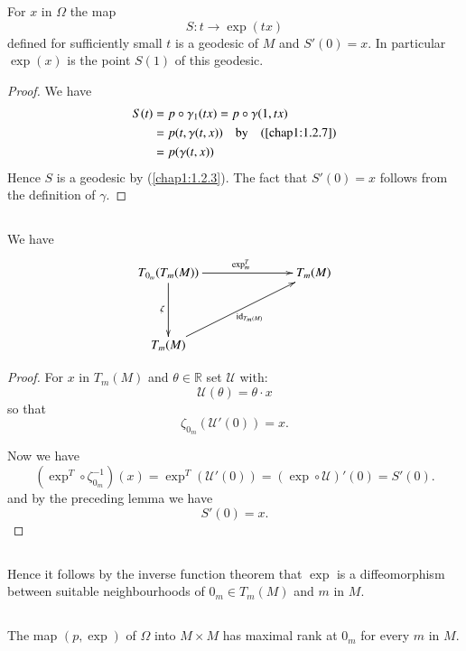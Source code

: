 \begin{lemma*}
For $x$ in $\Omega$ the map 
$$
S:t\to \exp (tx)
$$
defined for sufficiently small $t$ is a geodesic of $M$ and
$S'(0)=x$. In particular $\exp(x)$ is the point $S(1)$ of this geodesic.
\end{lemma*}

\begin{proof}
We have 
\begin{align*}
S(t) &= p\circ \gamma_{1}(tx)=p\circ\gamma(1,tx)\\
 &= p(t,\gamma(t,x))\quad\text{by}\quad \text{(\ref{chap1:1.2.7})}\\
 &= p(\gamma(t,x))
\end{align*}
Hence \pageoriginale $S$ is a geodesic by (\ref{chap1:1.2.3}). The fact that $S'(0)=x$
follows from the definition of $\gamma$.
\end{proof}

\setcounter{subsection}{5}
\subsection{}\label{chap1:1.4.6}
We have
\[
\xymatrix@C=2.5cm@R=1.5cm{
T_{0_{m}}(T_{m}(M))\ar[r]^{\exp^{T}_{m}}\ar[d]_{\zeta} & T_{m}(M)\\
T_{m}(M)\ar[ur]_{\id_{T_{m}(M)}} & 
}
\]

\begin{proof}
For $x$ in $T_{m}(M)$ and $\theta\in\mathbb{R}$ set $\mathscr{U}$
with:
$$
\mathscr{U}(\theta)=\theta\cdot x
$$
so that
$$
\zeta_{0_{m}}(\mathscr{U}'(0))=x.
$$

Now we have
$$
(\exp^{T}\circ\zeta^{-1}_{0_{m}})(x)=\exp^{T}(\mathscr{U}'(0))=(\exp
\circ \mathscr{U})'(0)=S'(0).
$$
and by the preceding lemma we have
$$
S'(0)=x.
$$
\end{proof}

\subsection{}\label{chap1:1.4.7}

Hence it follows by the inverse function theorem that $\exp$ is a
diffeomorphism \pageoriginale between suitable neighbourhoods of
$0_{m}\in T_{m}(M)$ and $m$ in $M$.

\subsection{}\label{chap1:1.4.8}


\begin{coro*}
The map $(p,\exp)$ of $\Omega$ into $M\times M$ has maximal rank at
$0_{m}$ for every $m$ in $M$.
\end{coro*}

